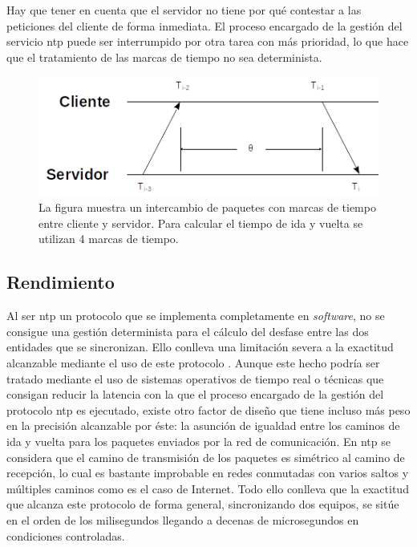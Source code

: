 
Hay que tener en cuenta que el servidor no tiene por qué contestar a las 
peticiones del cliente de forma inmediata. El proceso encargado de la gestión 
del servicio \gls{ntp} puede ser interrumpido por otra tarea con más prioridad, 
lo que hace que el tratamiento de las marcas de tiempo no sea determinista.

\begin{figure}
	\centering
	\includegraphics[width=0.7\linewidth]{imagenes/ntp_ts}
	\caption[Cálculo del desfase entre cliente y servidor]{La figura muestra un 
	intercambio de paquetes con marcas de tiempo entre cliente y servidor. Para 
	calcular el tiempo de ida y vuelta se utilizan 4 marcas de tiempo.}
	\label{fig:ntpts}
\end{figure}

\subsection{Rendimiento}

Al ser \gls{ntp} un protocolo que se implementa completamente en 
\textit{software}, no se consigue una gestión determinista para el cálculo del 
desfase entre las dos entidades que se sincronizan. Ello conlleva una 
limitación severa a la exactitud alcanzable mediante el uso de este protocolo 
. Aunque este hecho podría ser tratado mediante el 
uso de sistemas operativos de tiempo real o técnicas que consigan reducir la 
latencia con la que el proceso encargado de la gestión del protocolo \gls{ntp} 
es ejecutado, existe otro factor de diseño que tiene incluso más peso en la 
precisión alcanzable por éste: la asunción de igualdad entre los caminos de ida 
y vuelta para los paquetes enviados por la red de comunicación. En \gls{ntp} se 
considera que el camino de transmisión de los paquetes es simétrico al camino 
de recepción, lo cual es bastante improbable en redes conmutadas con varios 
saltos y múltiples caminos como es el caso de Internet. Todo ello conlleva que 
la exactitud que alcanza este protocolo de forma general, sincronizando dos 
equipos, se sitúe en el orden de los milisegundos llegando a decenas de 
microsegundos en condiciones controladas.